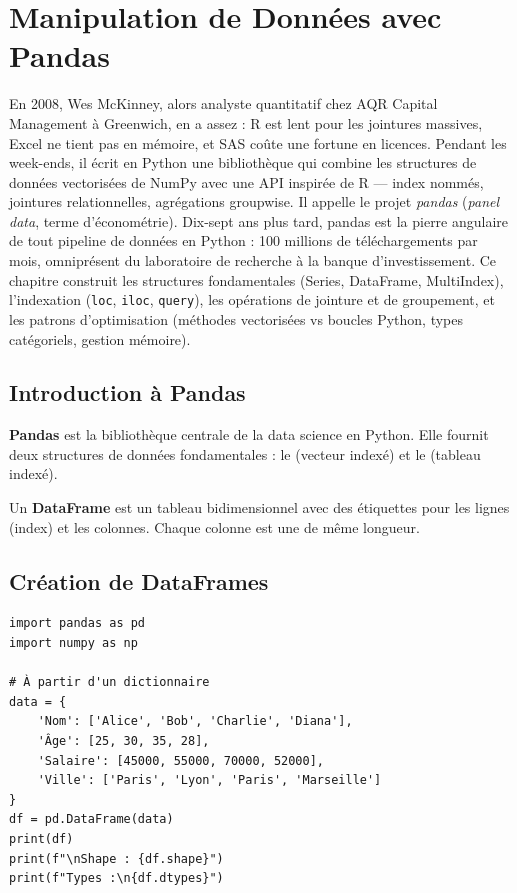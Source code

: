 \chapter{Manipulation de Donn\'ees avec Pandas}
\label{ch:pandas}

En 2008, Wes McKinney, alors analyste quantitatif chez AQR Capital Management à Greenwich, en a assez : R est lent pour les jointures massives, Excel ne tient pas en mémoire, et SAS coûte une fortune en licences. Pendant les week-ends, il écrit en Python une bibliothèque qui combine les structures de données vectorisées de NumPy avec une API inspirée de R --- index nommés, jointures relationnelles, agrégations groupwise. Il appelle le projet \emph{pandas} (\emph{panel data}, terme d'économétrie). Dix-sept ans plus tard, pandas est la pierre angulaire de tout pipeline de données en Python : 100 millions de téléchargements par mois, omniprésent du laboratoire de recherche à la banque d'investissement. Ce chapitre construit les structures fondamentales (Series, DataFrame, MultiIndex), l'indexation (\texttt{loc}, \texttt{iloc}, \texttt{query}), les opérations de jointure et de groupement, et les patrons d'optimisation (méthodes vectorisées vs boucles Python, types catégoriels, gestion mémoire).

\section{Introduction \`a Pandas}

\textbf{Pandas} est la biblioth\`eque centrale de la data science en Python. Elle fournit deux structures de donn\'ees fondamentales : le  (vecteur index\'e) et le  (tableau index\'e).

\begin{definition}[DataFrame]
Un \textbf{DataFrame} est un tableau bidimensionnel avec des \'etiquettes pour les lignes (index) et les colonnes. Chaque colonne est une  de m\^eme longueur.
\end{definition}

\section{Cr\'eation de DataFrames}

\begin{codeblock}[title=\textbf{Python --- Cr\'eation}]
\begin{verbatim}
import pandas as pd
import numpy as np

# À partir d'un dictionnaire
data = {
    'Nom': ['Alice', 'Bob', 'Charlie', 'Diana'],
    'Âge': [25, 30, 35, 28],
    'Salaire': [45000, 55000, 70000, 52000],
    'Ville': ['Paris', 'Lyon', 'Paris', 'Marseille']
}
df = pd.DataFrame(data)
print(df)
print(f"\nShape : {df.shape}")
print(f"Types :\n{df.dtypes}")
\end{verbatim}
\end{codeblock}

